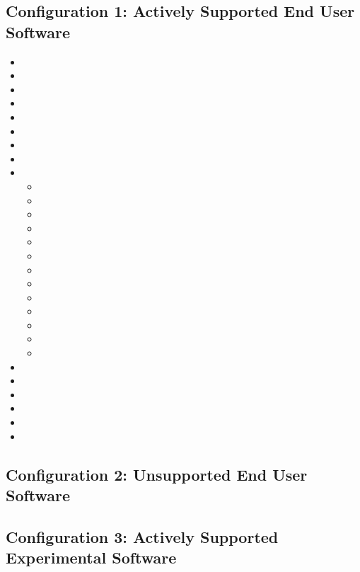 \documentclass[a4paper,11pt]{article}
\begin{document}
\subsection{Configuration 1: Actively Supported End User Software} 

\begin{itemize}
    \item \one 
    \item \two 
    \item \three
    \item \four
    \item \five
    \item \six
    \item \seven 
    \item \eight
    \item \nine
    \begin{itemize}
        \item \nineOne
        \item \nineTwo 
        \item \nineThree
        \item \nineFour 
        \item \nineFive 
        \item \nineSix 
        \item \nineSeven 
        \item \nineEight
        \item \nineNine 
        \item \nineTen 
        \item \nineEleven 
        \item \nineTwelve 
        \item \nineThirteen
    \end{itemize}
    \item \ten
    \item \eleven
    \item \twelve
    \item \thirteen
    \item \fourteen
    \item \fifteen
\end{itemize}
        

\subsection{Configuration 2: Unsupported End User Software} 

\subsection{Configuration 3: Actively Supported Experimental Software} 
\end{document}
